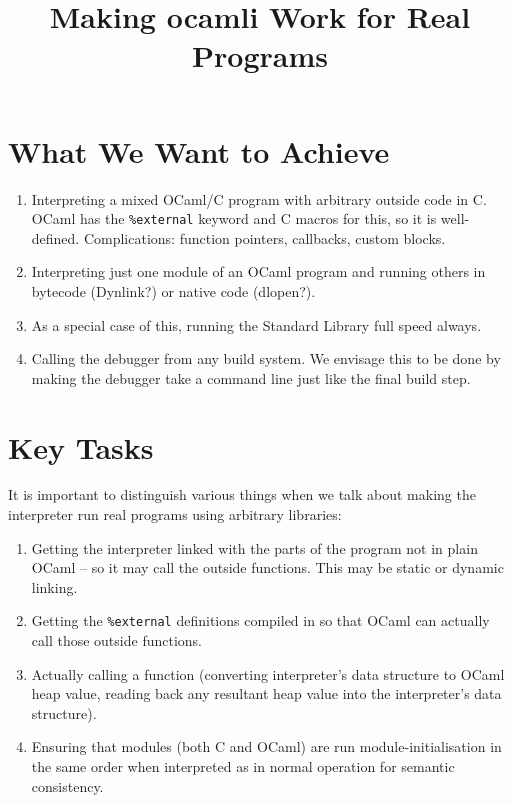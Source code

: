 \documentclass[10pt]{article}
\begin{document}
\title{Making \textsf{ocamli} Work for Real Programs}
\maketitle

\section*{What We Want to Achieve}

\begin{enumerate}
\item Interpreting a mixed OCaml/C program with arbitrary outside code in C. OCaml has the \texttt{\%external} keyword and C macros for this, so it is well-defined. Complications: function pointers, callbacks, custom blocks.
\item Interpreting just one module of an OCaml program and running others in bytecode (Dynlink?) or native code (dlopen?).
\item As a special case of this, running the Standard Library full speed always.
\item Calling the debugger from any build system. We envisage this to be done by making the debugger take a command line just like the final build step.
\end{enumerate}

\section*{Key Tasks}

It is important to distinguish various things when we talk about making the interpreter run real programs using arbitrary libraries:

\begin{enumerate}
\item Getting the interpreter linked with the parts of the program not in plain OCaml -- so it may call the outside functions. This may be static or dynamic linking.
\item Getting the \texttt{\%external} definitions compiled in so that OCaml can actually call those outside functions.
\item Actually calling a function (converting interpreter's data structure to OCaml heap value, reading back any resultant heap value into the interpreter's data structure).
\item Ensuring that modules (both C and OCaml) are run module-initialisation in the same order when interpreted as in normal operation for semantic consistency.
\end{enumerate}
\end{document}
